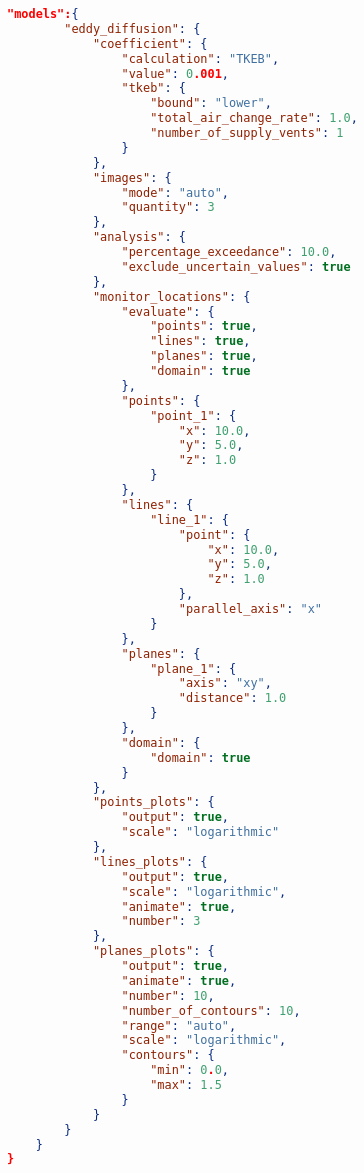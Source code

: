 \begin{lstlisting}[language=json,firstnumber=1]
    "models":{
        "eddy_diffusion": {
            "coefficient": {
                "calculation": "TKEB",
                "value": 0.001,
                "tkeb": {
                    "bound": "lower",
                    "total_air_change_rate": 1.0,
                    "number_of_supply_vents": 1
                }
            },
            "images": {
                "mode": "auto",
                "quantity": 3
            },
            "analysis": {
                "percentage_exceedance": 10.0,
                "exclude_uncertain_values": true
            },
            "monitor_locations": {
                "evaluate": {
                    "points": true,
                    "lines": true,
                    "planes": true,
                    "domain": true 
                },
                "points": {
                    "point_1": {
                        "x": 10.0,
                        "y": 5.0,
                        "z": 1.0
                    }
                },
                "lines": {
                    "line_1": {
                        "point": {
                            "x": 10.0,
                            "y": 5.0,
                            "z": 1.0 
                        },
                        "parallel_axis": "x"
                    }
                },
                "planes": {
                    "plane_1": {
                        "axis": "xy",
                        "distance": 1.0
                    }
                },
                "domain": {
                    "domain": true 
                }
            },
            "points_plots": {
                "output": true,
                "scale": "logarithmic"
            },
            "lines_plots": {
                "output": true,
                "scale": "logarithmic",
                "animate": true,
                "number": 3 
            },
            "planes_plots": {
                "output": true,
                "animate": true,
                "number": 10,
                "number_of_contours": 10,
                "range": "auto",
                "scale": "logarithmic",
                "contours": {
                    "min": 0.0,
                    "max": 1.5
                }
            }
        }
    }
}
\end{lstlisting}

